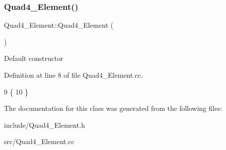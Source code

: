 \subsubsection{\texorpdfstring{Quad4\+\_\+\+Element()}{Quad4\_Element()}}
{\footnotesize\ttfamily Quad4\+\_\+\+Element\+::\+Quad4\+\_\+\+Element (\begin{DoxyParamCaption}{ }\end{DoxyParamCaption})}

Default constructor 

Definition at line 8 of file Quad4\+\_\+\+Element.\+cc.


\begin{DoxyCode}
9 \{
10 \}
\end{DoxyCode}


The documentation for this class was generated from the following files\+:\begin{DoxyCompactItemize}
\item 
include/Quad4\+\_\+\+Element.\+h\item 
src/Quad4\+\_\+\+Element.\+cc\end{DoxyCompactItemize}
